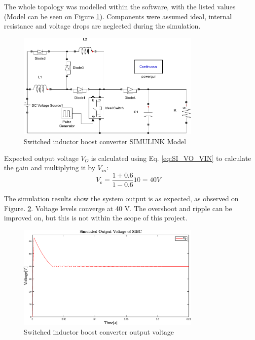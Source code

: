The whole topology was modelled within the software, with the listed values (Model can be seen on Figure \ref{fig:Model_SI}). Components were assumed ideal, internal resistance and voltage drops are neglected during the simulation. 

\begin{figure} [H]
   \centering
   \includegraphics[width=0.8\textwidth]{figures/bSwitchedInductor/Model_SI.pdf}
    \caption{Switched inductor boost converter SIMULINK Model}
	\label{fig:Model_SI}
\end{figure}

Expected output voltage $V_O$ is calculated using Eq. \ref{eq:SI_VO_VIN} to calculate the gain and multiplying it by $V_{in}$: 
\begin{equation}
	{V_o}= \frac{1+0.6}{1-0.6}10=40V
	\label{eq:Simulation_SI}
\end{equation}

The simulation results show the system output is as expected, as observed on Figure. \ref{fig:Simulation_SI}. Voltage levels converge at 40 V. The overshoot and ripple can be improved on, but this is not within the scope of this project. 


\begin{figure} [H]
   \centering
   \includegraphics[width=0.8\textwidth]{figures/bSwitchedInductor/Simulation_SI.eps}
    \caption{Switched inductor boost converter output voltage}
	\label{fig:Simulation_SI}
\end{figure}
\vspace{-8mm}
